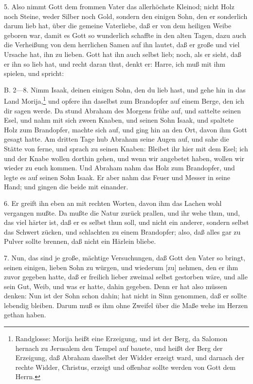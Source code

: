 5. Also nimmt Gott dem frommen Vater das allerhöchste Kleinod; nicht Holz noch Steine, weder Silber noch Gold, sondern den einigen Sohn, den er sonderlich darum lieb hat, über die gemeine Vaterliebe, daß er von dem heiligen Weibe geboren war, damit es Gott so wunderlich schaffte in den alten Tagen, dazu auch die Verheißung von dem herrlichen Samen auf ihn lautet, daß er große und viel Ursache hat, ihn zu lieben. Gott hat ihn auch selbst lieb; noch, als er sieht, daß er ihn so lieb hat, und recht daran thut, denkt er: Harre, ich muß mit ihm spielen, und spricht:

B. 2—8. Nimm Isaak, deinen einigen Sohn, den du lieb hast, und gehe hin in das Land Morija,\footnote{Randglosse: Morija heißt eine Erzeigung, und ist der Berg, da Salomon hernach zu Jerusalem den Tempel auf bauete, und heißt der Berg der Erzeigung, daß Abraham daselbst der Widder erzeigt ward, und darnach der rechte Widder, Christus, erzeigt und offenbar sollte werden von Gott dem Herrn.} und opfere ihn daselbst zum Brandopfer auf einem Berge, den ich dir sagen werde. Da stund Abraham des Morgens frühe auf, und sattelte seinen Esel, und nahm mit sich zween Knaben, und seinen Sohn Isaak, und spaltete Holz zum Brandopfer, machte sich auf, und ging hin an den Ort, davon ihm Gott gesagt hatte. Am dritten Tage hub Abraham seine Augen auf, und sahe die Stätte von ferne, und sprach zu seinen Knaben: Bleibet ihr hier mit dem Esel; ich und der Knabe wollen dorthin gehen, und wenn wir angebetet haben, wollen wir wieder zu euch kommen. Und Abraham nahm das Holz zum Brandopfer, und legte es auf seinen Sohn Isaak. Er aber nahm das Feuer und Messer in seine Hand; und gingen die beide mit einander.

6. Er greift ihn eben an mit rechten Worten, davon ihm das Lachen wohl vergangen mußte. Da mußte die Natur zurück prallen, und ihr wehe thun, und, das viel härter ist, daß er es selbst thun soll, und nicht ein anderer, sondern selbst das Schwert zücken, und schlachten zu einem Brandopfer; also, daß alles gar zu Pulver sollte brennen, daß nicht ein Härlein bliebe.

7. Nun, das sind je große, mächtige Versuchungen, daß Gott den Vater so bringt, seinen einigen, lieben Sohn zu würgen, und wiederum [zu] nehmen, den er ihm zuvor gegeben hatte, daß er freilich lieber zweimal selbst gestorben wäre, und alle sein Gut, Weib, und was er hatte, dahin gegeben. Denn er hat also müssen denken: Nun ist der Sohn schon dahin; hat nicht in Sinn genommen, daß er sollte lebendig bleiben. Darum muß es ihm ohne Zweifel über die Maße wehe im Herzen gethan haben.

